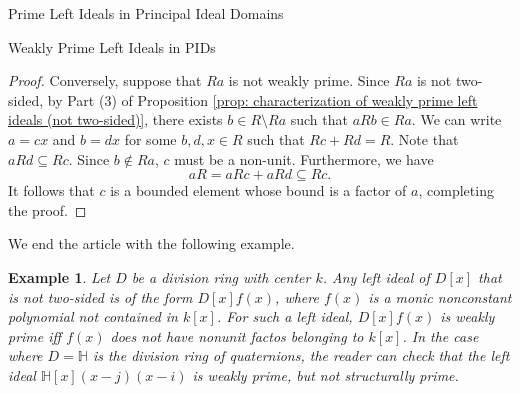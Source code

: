 \documentclass[11pt,a4paper]{article}
\theoremstyle{theorem}
\newtheorem{example}{Example}[section]
\numberwithin{equation}{section}
\begin{document}
\begin{section}{Prime Left Ideals in Principal Ideal Domains}
\begin{subsection}{Weakly Prime Left Ideals in PIDs}
\begin{proof}
			Conversely, suppose that \(Ra\) is not weakly prime. Since \(Ra\) is not two-sided, by Part (3) of Proposition \ref{prop: characterization of weakly prime left ideals (not two-sided)}, there exists \(b\in R\setminus Ra\) such that \(aRb\in Ra\). We can write \(a = cx\) and \(b = dx\) for some \(b,d,x\in R\) such that \(Rc + Rd = R\). Note that \(aRd\subseteq Rc\). Since \(b\notin Ra\), \(c\) must be a non-unit. Furthermore, we have 
			\[
				aR = aRc + aRd \subseteq Rc.
			\]
			It follows that \(c\) is a bounded element whose bound is a  factor of \(a\),  completing the proof. 
		\end{proof}
		We end the article with the following example.  
		\begin{example}\label{exam: weakly prime ideals in D[x]}
			Let \(D\) be a division ring with center \(k\). Any left ideal of \(D[x]\) that is not two-sided is of the form \(D[x]f(x)\), where \(f(x)\) is a monic nonconstant polynomial not contained in \(k[x]\). For such a left ideal, \(D[x]f(x)\) is weakly prime iff \(f(x)\) does not have nonunit factos belonging to \(k[x]\).  In the case where \(D = \mathbb{H}\) is the division ring of quaternions, the reader can check that the left ideal \( \mathbb{H}[x](x-j)(x-i)\) is weakly prime, but not structurally prime.  
		\end{example}
	\end{subsection}

	 	
\end{section}





 
\end{document}

